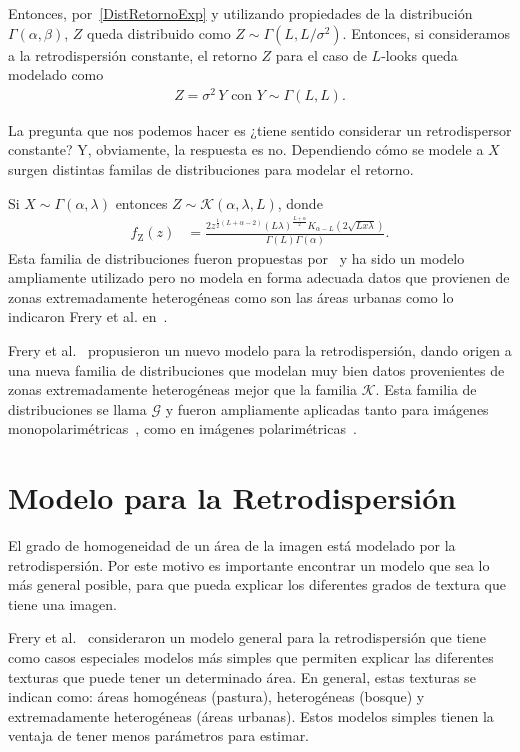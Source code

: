 Entonces, por~\eqref{DistRetornoExp} y utilizando propiedades de la distribución $\Gamma(\alpha,\beta)$, $Z$  queda distribuido como $Z \sim \Gamma(L,L/\sigma^2)$. Entonces, si consideramos a la retrodispersión constante, el retorno $Z$ para el caso de $L$-looks queda modelado como
\begin{align}
Z=\sigma^2 \, Y \text{ con } Y \sim \Gamma(L,L).
\end{align}

La pregunta que nos podemos hacer es ¿tiene sentido considerar un retrodispersor constante? Y, obviamente, la respuesta es no. Dependiendo cómo se modele a $X$ surgen distintas familas de distribuciones para modelar el retorno.

Si $X \sim \Gamma(\alpha,\lambda)$ entonces $Z \sim \mathcal{K}(\alpha,\lambda,L)$, donde
\begin{align}
f_{\text{Z}}(z)&=\frac{2 z^{\frac{1}{2} (L+\alpha-2 )} (L \lambda )^{\frac{L+\alpha }{2}} K_{\alpha -L}\left(2 \sqrt{L x
		\lambda }\right)}{\Gamma (L) \Gamma (\alpha )}.
\end{align}
 Esta familia de distribuciones fueron propuestas por~\cite{Jakeman87} y ha sido un modelo ampliamente utilizado pero no modela en forma adecuada datos que provienen de zonas extremadamente heterogéneas como son las áreas urbanas como lo indicaron Frery et al. en~\cite{Frery97}.

Frery et al.~\cite{Frery99} propusieron un nuevo modelo para la retrodispersión, dando origen a una nueva familia de distribuciones que modelan muy bien datos provenientes de zonas extremadamente heterogéneas mejor que la familia $\mathcal{K}$. Esta familia de distribuciones se llama $\mathcal{G}$ y fueron ampliamente aplicadas tanto para imágenes monopolarimétricas~\cite{gambini2015,Nascimento2009}, como en imágenes polarimétricas~\cite{Freitas2005,Palacio2019}.

\section{Modelo para la Retrodispersión}
\label{ModeloBackscatter}

El grado de homogeneidad de un área de la imagen está modelado por la retrodispersión. Por este motivo es importante encontrar un modelo que sea lo más general posible, para que pueda explicar los diferentes grados de textura que tiene una imagen.

Frery et al.~\cite{Frery99} consideraron un modelo general para la retrodispersión que tiene como casos especiales modelos más simples que permiten explicar las diferentes texturas que puede tener un determinado área. En general, estas texturas se indican como: áreas homogéneas (pastura), heterogéneas (bosque) y extremadamente heterogéneas (áreas urbanas). Estos modelos simples tienen la ventaja de tener menos parámetros para estimar.

